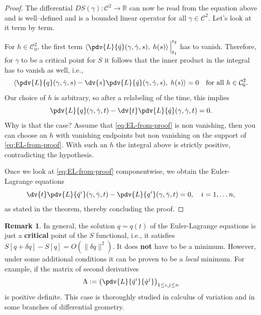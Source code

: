 \documentclass[english,fontsize=11pt,paper=b5]{scrbook}
\theoremstyle{definition}
\newtheorem{remark}{Remark}[chapter]
\begin{document}
\begin{proof}
      The differential $DS(\gamma): {\mathcal{C}^2} \to \mathbb{R}$ can now be read from the equation above and is well--defined and is a bounded linear operator for all $\gamma\in {\mathcal{C}^2}$. Let's look at it term by term.\medskip

      For $h\in \mathcal{C}^2_0$, the first term $\left\langle\pdv{L}{\dot q}(\gamma, \dot \gamma, s),\; h(s)\right\rangle\Big|_{t_1}^{t_2}$ has to vanish. Therefore, for $\gamma$ to be a critical point for $S$ it follows that the inner product in the integral has to vanish as well, i.e.,
      \begin{equation}
        \left\langle
          \pdv{L}{q}(\gamma, \dot \gamma, s)
          - \dv{s}\pdv{L}{\dot q}(\gamma, \dot \gamma, s)
        ,\; h(s)\right\rangle = 0 \quad\mbox{for all } h\in \mathcal{C}^2_0.
      \end{equation}
      Our choice of $h$ is arbitrary, so after a relabeling of the time, this implies
      \begin{equation}\label{eq:EL-from-proof}
        \pdv{L}{q}(\gamma, \dot \gamma, t)
        - \dv{t}\pdv{L}{\dot q}(\gamma, \dot \gamma, t) = 0.
      \end{equation}
      Why is that the case? Assume that \eqref{eq:EL-from-proof} is non vanishing, then you can choose an $h$ with vanishing endpoints but non vanishing on the support of \eqref{eq:EL-from-proof}. With such an $h$ the integral above is strictly positive, contradicting the hypothesis.

      Once we look at \eqref{eq:EL-from-proof} componentwise, we obtain the Euler-Lagrange equations
      \begin{equation}
        \dv{t}\pdv{L}{\dot q^i}(\gamma, \dot \gamma, t) - \pdv{L}{q^i}(\gamma, \dot \gamma, t) = 0, \quad i=1,\ldots n,
      \end{equation}
      as stated in the theorem, thereby concluding the proof.
    \end{proof}

    \begin{remark}
      In general, the solution $q=q(t)$ of the Euler-Lagrange equations is just a \textbf{critical} point of the $S$ functional, i.e., it satisfies $S[q + \delta q] - S[q] = O(\|\delta q\|^2)$.
      It does \textbf{not} have to be a minimum.
      However, under some additional conditions it can be proven to be a \emph{local} minimum.
      For example, if the matrix of second derivatives
      \begin{equation}\label{eq:hsd}
        \Lambda := \left( \pdv{L}{\dot q^i}{\dot q^j} \right)_{1\leq i,j\leq n}
      \end{equation}
      is positive definite.
      This case is thoroughly studied in calculus of variation and in some branches of differential geometry.
    \end{remark}
\end{document}
